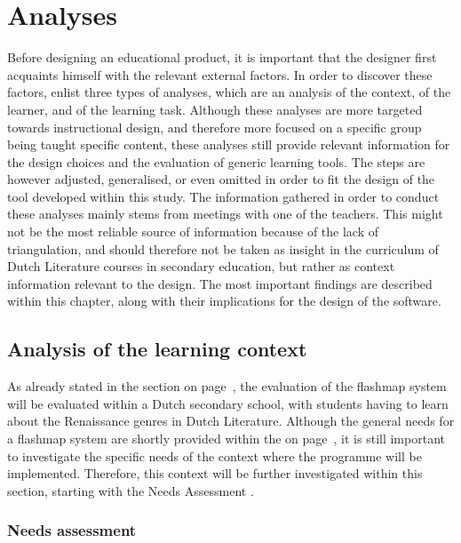 \chapter{Analyses}

\label{ch:analysis}

Before designing an educational product, it is important that the designer first acquaints himself with the relevant external factors. In order to discover these factors,  enlist three types of analyses, which are an analysis of the context, of the learner, and of the learning task. Although these analyses are more targeted towards instructional design, and therefore more focused on a specific group being taught specific content, these analyses still provide relevant information for the design choices and the evaluation of generic learning tools. The steps are however adjusted, generalised, or even omitted in order to fit the design of the tool developed within this study. The information gathered in order to conduct these analyses mainly stems from meetings with one of the teachers. This might not be the most reliable source of information because of the lack of triangulation, and should therefore not be taken as insight in the curriculum of Dutch Literature courses in secondary education, but rather as context information relevant to the design. The most important findings are described within this chapter, along with their implications for the design of the software.

\section{Analysis of the learning context}
\label{sec:contextanalysis}

As already stated in the  section on page~\pageref{sec:intro_evaluation}, the evaluation of the flashmap system will be evaluated within a Dutch secondary school, with students having to learn about the Renaissance genres in Dutch Literature. Although the general needs for a flashmap system are shortly provided within the  on page~\pageref{sec:intro_evaluation}, it is still important to investigate the specific needs of the context where the programme will be implemented. Therefore, this context will be further investigated within this section, starting with the Needs Assessment \cite{instructionaldesign}. 

\subsection{Needs assessment}
\label{subsec:needsassessment}

